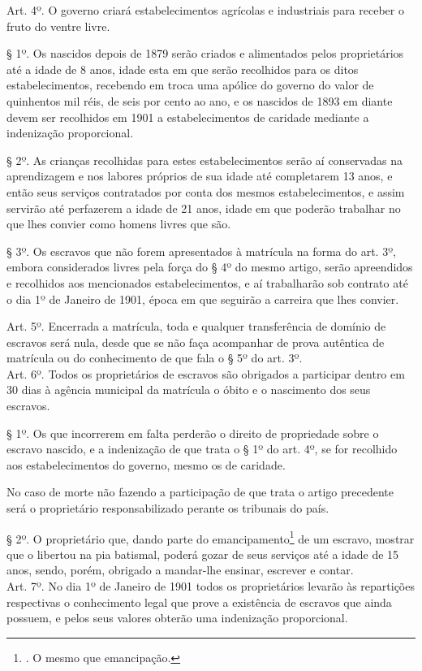 Art. 4º. O governo criará estabelecimentos agrícolas e industriais para
receber o fruto do ventre livre.

§ 1º. Os nascidos depois de 1879 serão criados e alimentados pelos
proprietários até a idade de 8 anos, idade esta em que serão recolhidos
para os ditos estabelecimentos, recebendo em troca uma apólice do
governo do valor de quinhentos mil réis, de seis por cento ao ano, e os
nascidos de 1893 em diante devem ser recolhidos em 1901 a
estabelecimentos de caridade mediante a indenização proporcional.

§ 2º. As crianças recolhidas para estes estabelecimentos serão aí
conservadas na aprendizagem e nos labores próprios de sua idade até
completarem 13 anos, e então seus serviços contratados por conta dos
mesmos estabelecimentos, e assim servirão até perfazerem a idade de 21
anos, idade em que poderão trabalhar no que lhes convier como homens
livres que são.

§ 3º. Os escravos que não forem apresentados à matrícula na forma do
art. 3º, embora considerados livres pela força do § 4º do mesmo artigo,
serão apreendidos e recolhidos aos mencionados estabelecimentos, e aí
trabalharão sob contrato até o dia 1º de Janeiro de 1901, época em que
seguirão a carreira que lhes convier.

Art. 5º. Encerrada a matrícula, toda e qualquer transferência de domínio
de escravos será nula, desde que se não faça acompanhar de prova
autêntica de matrícula ou do conhecimento de que fala o § 5º do art.
3º.\\
Art. 6º. Todos os proprietários de escravos são obrigados a participar
dentro em 30 dias à agência municipal da matrícula o óbito e o
nascimento dos seus escravos.

§ 1º. Os que incorrerem em falta perderão o direito de propriedade sobre
o escravo nascido, e a indenização de que trata o § 1º do art. 4º, se
for recolhido aos estabelecimentos do governo, mesmo os de caridade.

No caso de morte não fazendo a participação de que trata o artigo
precedente será o proprietário responsabilizado perante os tribunais do
país.

§ 2º. O proprietário que, dando parte do emancipamento\footnote{. O
  mesmo que emancipação.} de um escravo, mostrar que o libertou na pia
batismal, poderá gozar de seus serviços até a idade de 15 anos, sendo,
porém, obrigado a mandar-lhe ensinar, escrever e contar.\\
Art. 7º. No dia 1º de Janeiro de 1901 todos os proprietários levarão às
repartições respectivas o conhecimento legal que prove a existência de
escravos que ainda possuem, e pelos seus valores obterão uma indenização
proporcional.

